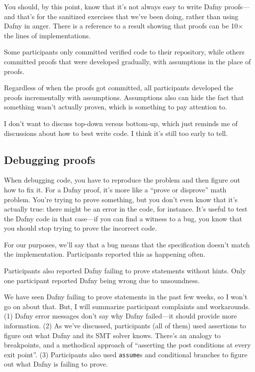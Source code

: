 \documentclass[11pt]{article}
\begin{document}
You should, by this point, know that it's not always easy to write Dafny proofs---and that's
for the sanitized exercises that we've been doing, rather than using Dafny in anger.
There is a reference to a result showing that proofs can be 10$\times$ the lines of implementations.

Some participants only committed verified code to their repository, while others committed proofs that were developed
gradually, with assumptions in the place of proofs.

Regardless of when the proofs got committed, all participants developed the proofs incrementally
with assumptions. Assumptions also can hide the fact that something wasn't actually proven,
which is something to pay attention to.

I don't want to discuss top-down versus bottom-up, which just reminds me of discussions
about how to best write code. I think it's still too early to tell.

\subsection*{Debugging proofs}
When debugging code, you have to reproduce the problem and then figure out how to fix it.
For a Dafny proof, it's more like a ``prove or disprove'' math problem. You're trying to
prove something, but you don't even know that it's actually true: there might be an error
in the code, for instance. It's useful to test the Dafny code in that case---if you can
find a witness to a bug, you know that you should stop trying to prove the incorrect code.

For our purposes, we'll say that a bug means that the specification
doesn't match the implementation.  Participants reported this as
happening often.

Participants also reported Dafny failing to prove statements without hints. Only one
participant reported Dafny being wrong due to unsoundness.

We have seen Dafny failing to prove statements in the past few weeks,
so I won't go on about that. But, I will summarize participant
complaints and workarounds. (1) Dafny error messages don't say why
Dafny failed---it should provide more information. (2) As we've
discussed, participants (all of them) used assertions to figure out
what Dafny and its SMT solver knows.  There's an analogy to
breakpoints, and a methodical approach of ``asserting the post
conditions at every exit point''. (3) Participants also used \texttt{assume}s
and conditional branches to figure out what Dafny is failing to prove.
\end{document}
